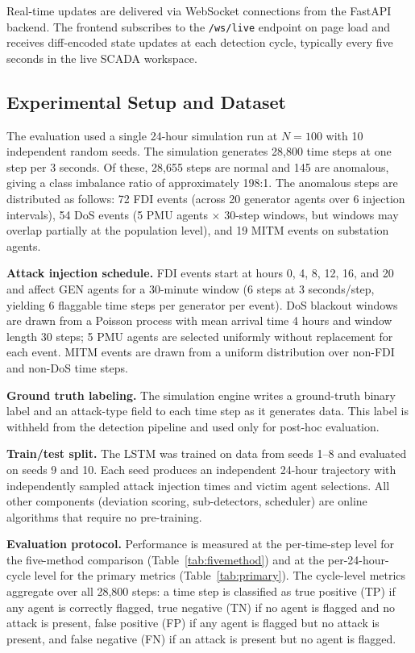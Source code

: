 Real-time updates are delivered via WebSocket connections from the FastAPI backend. The frontend
subscribes to the \texttt{/ws/live} endpoint on page load and receives diff-encoded state updates
at each detection cycle, typically every five seconds in the live SCADA workspace.

\subsection{Experimental Setup and Dataset}
\label{sec:expsetup}

The evaluation used a single 24-hour simulation run at $N = 100$ with 10 independent random seeds.
The simulation generates 28,800 time steps at one step per 3 seconds. Of these, 28,655 steps are
normal and 145 are anomalous, giving a class imbalance ratio of approximately 198:1. The anomalous
steps are distributed as follows: 72 FDI events (across 20 generator agents over 6 injection
intervals), 54 DoS events (5 PMU agents $\times$ 30-step windows, but windows may overlap partially
at the population level), and 19 MITM events on substation agents.

\textbf{Attack injection schedule.} FDI events start at hours 0, 4, 8, 12, 16, and 20 and affect
GEN agents for a 30-minute window (6 steps at 3 seconds/step, yielding 6 flaggable time steps per
generator per event). DoS blackout windows are drawn from a Poisson process with mean arrival time
4 hours and window length 30 steps; 5 PMU agents are selected uniformly without replacement for
each event. MITM events are drawn from a uniform distribution over non-FDI and non-DoS time steps.

\textbf{Ground truth labeling.} The simulation engine writes a ground-truth binary label and an
attack-type field to each time step as it generates data. This label is withheld from the detection
pipeline and used only for post-hoc evaluation.

\textbf{Train/test split.} The LSTM was trained on data from seeds 1--8 and evaluated on seeds 9
and 10. Each seed produces an independent 24-hour trajectory with independently sampled attack
injection times and victim agent selections. All other components (deviation scoring, sub-detectors,
scheduler) are online algorithms that require no pre-training.

\textbf{Evaluation protocol.} Performance is measured at the per-time-step level for the
five-method comparison (Table~\ref{tab:fivemethod}) and at the per-24-hour-cycle level for the
primary metrics (Table~\ref{tab:primary}). The cycle-level metrics aggregate over all 28,800 steps:
a time step is classified as true positive (TP) if any agent is correctly flagged, true negative
(TN) if no agent is flagged and no attack is present, false positive (FP) if any agent is flagged
but no attack is present, and false negative (FN) if an attack is present but no agent is flagged.

